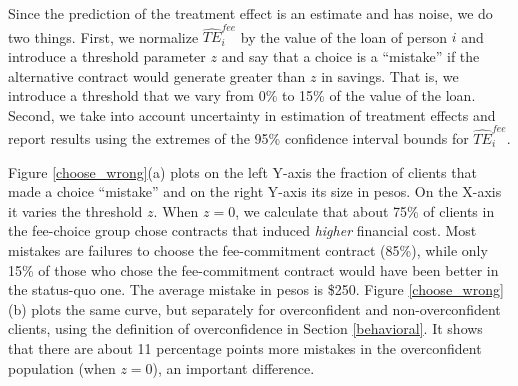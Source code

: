 \documentclass[oneside,11pt]{article}
\begin{document}


Since the prediction of the treatment effect is an estimate and has noise, we do two things. First, we normalize $\widehat{TE}^{fee}_{i}$ by the value of the loan of person $i$ and introduce a threshold parameter $z$ and say that a choice is a ``mistake'' if the alternative contract would generate greater than $z$ in savings. That is, we introduce a threshold that we vary from 0\% to 15\% of the value of the loan. {Second, we take into account uncertainty in estimation of treatment effects and report results using the extremes of the 95\% confidence interval bounds for $\widehat{TE}^{fee}_{i}$.}

Figure \ref{choose_wrong}(a) plots on the left Y-axis the fraction of clients that made a choice ``mistake'' and on the right Y-axis its size in pesos. On the X-axis it varies the threshold $z$. When $z=0$, we calculate that about 75\% of clients in the fee-choice group chose contracts that induced \textit{higher} financial cost.  %
Most mistakes are failures to choose the fee-commitment contract ({85}\%), while only {15}\% of those who chose the fee-commitment contract would have been better in the status-quo one. The average mistake in pesos is \$250. %
Figure \ref{choose_wrong}(b) plots the same curve, but separately for overconfident and non-overconfident clients, using the definition of overconfidence in Section \ref{behavioral}. {It shows that there are about 11 percentage points more mistakes in the overconfident population (when $z=0$), an important difference.}
\end{document}
